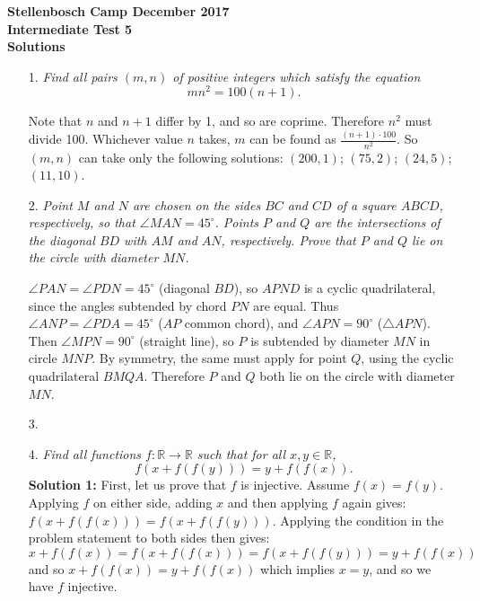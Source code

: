 \documentclass[a4paper,12pt]{article}
\begin{document}
\begin{center}
\textbf{Stellenbosch Camp December 2017 \\ Intermediate Test 5} \\
\textbf{Solutions}
\end{center}


\begin{enumerate}
  
  \item[1.] \emph{Find all pairs $(m,n)$ of positive integers which satisfy the equation
  \[ mn^2 = 100(n+1). \]} 
  
  Note that $n$ and $n+1$ differ by 1, and so are coprime. Therefore $n^2$ must divide 100. Whichever value $n$ takes, $m$ can be found as $\frac{(n+1)\cdot100}{n^2}$. So $(m,n)$ can take only the following solutions: $(200,1)$; $(75,2)$; $(24,5)$; $(11,10)$.
  
  \item[2.] \emph{Point $M$ and $N$ are chosen on the sides $BC$ and $CD$ of a square $ABCD$, respectively, so that $\angle MAN = 45^\circ$. Points $P$ and $Q$ are the intersections of the diagonal $BD$ with $AM$ and $AN$, respectively. Prove that $P$ and $Q$ lie on the circle with diameter $MN$.}
  
  $\angle PAN=\angle PDN = 45^\circ$ (diagonal $BD$), so $APND$ is a cyclic quadrilateral, since the angles subtended by chord $PN$ are equal. Thus $\angle ANP= \angle PDA = 45^\circ$ ($AP$ common chord), and $\angle APN=90^\circ$ ($\triangle APN$). Then $\angle MPN=90^\circ$ (straight line), so $P$ is subtended by diameter $MN$ in circle $MNP$. By symmetry, the same must apply for point $Q$, using the cyclic quadrilateral $BMQA$. Therefore $P$ and $Q$ both lie on the circle with diameter $MN$.
  
  \item[3.] 


  \item[4.] \emph{Find all functions $f: \mathbb{R} \to \mathbb{R}$ such that for all $x,y \in \mathbb{R}$,
\[ f(x+f(f(y))) = y+f(f(x)). \]}
  \textbf{Solution 1:} First, let us prove that $f$ is injective. Assume $f(x)=f(y)$. Applying $f$ on either side, adding $x$ and then applying $f$ again gives: $f(x+f(f(x))) = f(x+f(f(y)))$. Applying the condition in the problem statement to both sides then gives:  
  \begin{equation*}
    x+f(f(x)) = f(x+f(f(x))) = f(x+f(f(y))) = y+f(f(x)) 
  \end{equation*} 
  and so $x+f(f(x)) = y+f(f(x))$ which implies $x=y$, and so we have $f$ injective.
  

\end{enumerate}
\end{document}
